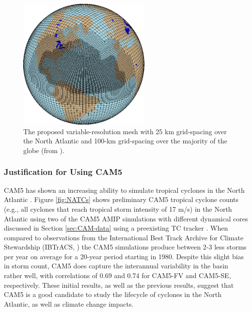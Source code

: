 \documentclass[11pt]{article}
\begin{document}
\begin{figure}[t]
\begin{center}
\includegraphics[width=2.6in]{NA_mesh.eps}
\end{center}
\caption{The proposed variable-resolution mesh with 25 km grid-spacing over the North Atlantic and 100-km grid-spacing over the majority of the globe (from \citet{Zarzycki2014multidecadal}).} \label{fig:NA_mesh}
\end{figure}

\subsubsection{Justification for Using CAM5}

CAM5 has shown an increasing ability to simulate tropical cyclones in the North Atlantic \citep{Bacmeister2014,Wehner2014,Reed2015b}.  Figure \ref{fig:NATCs} shows preliminary CAM5 tropical cyclone counts (e.g., all cyclones that reach tropical storm intensity of 17 m/s) in the North Atlantic using two of the CAM5 AMIP simulations with different dynamical cores discussed in Section \ref{sec:CAM-data} using a preexisting TC tracker \citep{Zhao2009}. When compared to observations from the International Best Track Archive for Climate Stewardship (IBTrACS, \citet{Knapp2010}) the CAM5 simulations produce between 2-3 less storms per year on average for a 20-year period starting in 1980. Despite this slight bias in storm count, CAM5 does capture the interannual variability in the basin rather well, with correlations of 0.69 and 0.74 for CAM5-FV and CAM5-SE, respectively. These initial results, as well as the previous results, suggest that CAM5 is a good candidate to study the lifecycle of cyclones in the North Atlantic, as well as climate change impacts.
\end{document}
